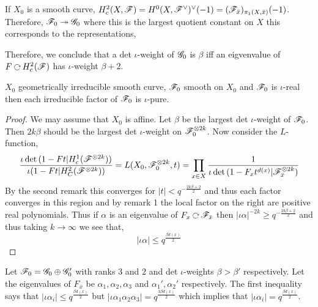 \documentclass[12pt]{article}
\begin{document}
\begin{rmk}
If $X_0$ is a smooth curve, $H_c^2(X, \mathscr{F}) = H^0(X, \mathscr{F}^\vee)^\vee(-1) = (\mathscr{F}_{\bar{x}})_{\pi_1(X, \bar{x})}(-1)$. Therefore, $\mathscr{F}_0 \twoheadrightarrow \mathscr{G}_0$ where this is the largest quotient constant on $X$ this corresponds to the representations,
\begin{center}
\end{center}
Therefore, we conclude that a det $\iota$-weight of $\mathscr{G}_0$ is $\beta$ iff an eigvenvalue of $F \acts H^2_c(\F)$ has $\iota$-weight $\beta + 2$. 
\end{rmk}

\begin{thm}
$X_0$ geometrically irreducible smooth curve, $\mathscr{F}_0$ smooth on $X_0$ and $\mathscr{F}_0$ is $\iota$-real then each irreducible factor of $\mathscr{F}_0$ is $\iota$-pure.
\end{thm}

\begin{proof}
We may assume that $X_0$ is affine. Let $\beta$ be the largest det $\iota$-weight of $\mathscr{F}_0$. Then $2k \beta$ should be the largest det $\iota$-weight on $\mathscr{F}_0^{\otimes 2k}$. Now consider the $L$-function,
\[ \frac{\iota \det{(1 - Ft | H^1_c(\mathscr{F}^{\otimes 2k}))}}{\iota{(1 - F t | H^2_C(\mathscr{F}^{\otimes 2k}))}} = L(X_0, \mathscr{F}_0^{\otimes 2k}, t) = \prod_{x \in X} \frac{1}{\iota \det{(1 - F_x t^{d(x)} | \mathscr{F}^{\otimes 2k}_{\bar{x}})}} \]
By the second remark this converges for $|t| < q^{-\frac{2k \beta + 2}{2}}$ and thus each factor converges in this region and by remark 1 the local factor on the right are positive real polynomials. Thus if $\alpha$ is an eigenvalue of $F_x \acts \F_{\bar{x}}$ then $|\iota \alpha|^{-2k} \ge q^{-\frac{2 k \beta + 2}{2}}$ and thus taking $k \to \infty$ we see that,
\[ |\iota \alpha| \le q^{\frac{\beta d(x)}{2}} \]
\end{proof}

\begin{example}
Let $\mathscr{F}_0 = \mathscr{G}_0 \oplus \mathscr{G}_0'$ with ranks $3$ and $2$ and det $\iota$-weights $\beta > \beta'$ respectively. Let the eigenvalues of $F_{\bar{x}}$ be $\alpha_1, \alpha_2, \alpha_3$ and $\alpha_1', \alpha_2'$ respectively. The first inequality says that $|\iota \alpha_i| \le q^{\frac{\beta d(x)}{2}}$ but $|\iota \alpha_1 \alpha_2 \alpha_3| = q^{\frac{3 \beta d(x)}{2}}$ which implies that $|\iota \alpha_i| = q^{\frac{\beta d(x)}{2}}$.
\end{example}
\end{document}
